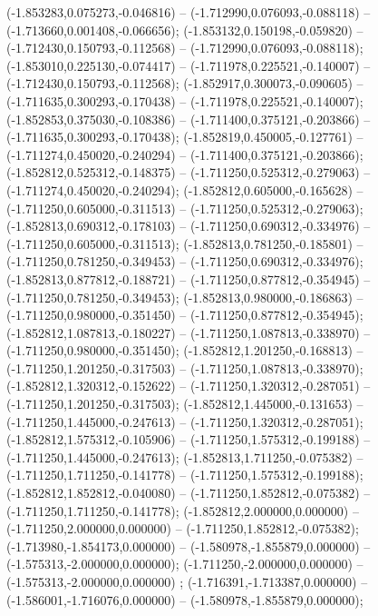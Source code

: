  (-1.853283,0.075273,-0.046816) -- (-1.712990,0.076093,-0.088118) -- (-1.713660,0.001408,-0.066656);
 (-1.853132,0.150198,-0.059820) -- (-1.712430,0.150793,-0.112568) -- (-1.712990,0.076093,-0.088118);
 (-1.853010,0.225130,-0.074417) -- (-1.711978,0.225521,-0.140007) -- (-1.712430,0.150793,-0.112568);
 (-1.852917,0.300073,-0.090605) -- (-1.711635,0.300293,-0.170438) -- (-1.711978,0.225521,-0.140007);
 (-1.852853,0.375030,-0.108386) -- (-1.711400,0.375121,-0.203866) -- (-1.711635,0.300293,-0.170438);
 (-1.852819,0.450005,-0.127761) -- (-1.711274,0.450020,-0.240294) -- (-1.711400,0.375121,-0.203866);
 (-1.852812,0.525312,-0.148375) -- (-1.711250,0.525312,-0.279063) -- (-1.711274,0.450020,-0.240294);
 (-1.852812,0.605000,-0.165628) -- (-1.711250,0.605000,-0.311513) -- (-1.711250,0.525312,-0.279063);
 (-1.852813,0.690312,-0.178103) -- (-1.711250,0.690312,-0.334976) -- (-1.711250,0.605000,-0.311513);
 (-1.852813,0.781250,-0.185801) -- (-1.711250,0.781250,-0.349453) -- (-1.711250,0.690312,-0.334976);
 (-1.852813,0.877812,-0.188721) -- (-1.711250,0.877812,-0.354945) -- (-1.711250,0.781250,-0.349453);
 (-1.852813,0.980000,-0.186863) -- (-1.711250,0.980000,-0.351450) -- (-1.711250,0.877812,-0.354945);
 (-1.852812,1.087813,-0.180227) -- (-1.711250,1.087813,-0.338970) -- (-1.711250,0.980000,-0.351450);
 (-1.852812,1.201250,-0.168813) -- (-1.711250,1.201250,-0.317503) -- (-1.711250,1.087813,-0.338970);
 (-1.852812,1.320312,-0.152622) -- (-1.711250,1.320312,-0.287051) -- (-1.711250,1.201250,-0.317503);
 (-1.852812,1.445000,-0.131653) -- (-1.711250,1.445000,-0.247613) -- (-1.711250,1.320312,-0.287051);
 (-1.852812,1.575312,-0.105906) -- (-1.711250,1.575312,-0.199188) -- (-1.711250,1.445000,-0.247613);
 (-1.852813,1.711250,-0.075382) -- (-1.711250,1.711250,-0.141778) -- (-1.711250,1.575312,-0.199188);
 (-1.852812,1.852812,-0.040080) -- (-1.711250,1.852812,-0.075382) -- (-1.711250,1.711250,-0.141778);
 (-1.852812,2.000000,0.000000) -- (-1.711250,2.000000,0.000000) -- (-1.711250,1.852812,-0.075382);
 (-1.713980,-1.854173,0.000000) -- (-1.580978,-1.855879,0.000000) -- (-1.575313,-2.000000,0.000000);
 (-1.711250,-2.000000,0.000000) -- (-1.575313,-2.000000,0.000000) ;
 (-1.716391,-1.713387,0.000000) -- (-1.586001,-1.716076,0.000000) -- (-1.580978,-1.855879,0.000000);
